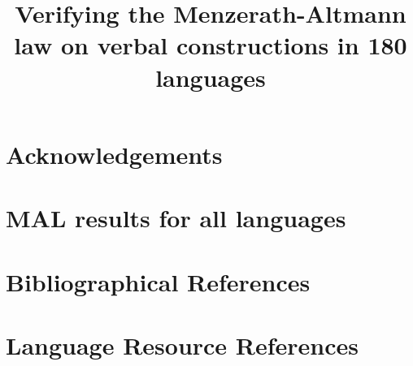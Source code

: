 \documentclass[10pt, a4paper]{article}
\title{Verifying the Menzerath-Altmann law on verbal constructions in 180 languages}
\begin{document}
\maketitleabstract








\section{Acknowledgements}


\appendix
\section{MAL results for all languages}\label{app:all-languages}


\section{Bibliographical References}\label{sec:reference}




\section{Language Resource References}
\label{lr:ref}
\end{document}
